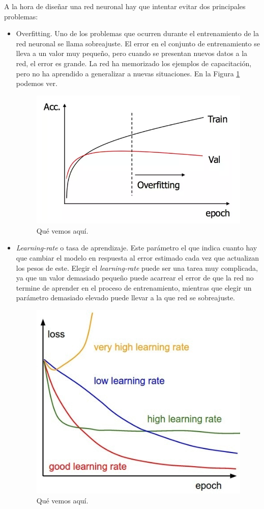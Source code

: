 \documentclass[
  a4paper,
  12pt,
  spanish,
]{scrartcl}
\theoremstyle{teorema-style}
\begin{document}
A la hora de diseñar una red neuronal hay que intentar evitar dos principales problemas:
\begin{itemize}

\item Overfitting. Uno de los problemas que ocurren durante el entrenamiento de la red neuronal se llama sobreajuste. El error en el conjunto de entrenamiento se lleva a un valor muy pequeño, pero cuando se presentan nuevos datos a la red, el error es grande. La red ha memorizado los ejemplos de capacitación, pero no ha aprendido a generalizar a nuevas situaciones. En la Figura \ref{fig:overfitting} podemos ver.

\begin{figure}[h]
  \centering
  \includegraphics[width=.8\textwidth]{img/overfitting}
  \caption{Qué vemos aquí.}
  \label{fig:overfitting}
\end{figure}

\item \textit{Learning-rate} o tasa de aprendizaje. Este parámetro el que indica cuanto hay que cambiar el modelo en respuesta al error estimado cada vez que actualizan los pesos de este. Elegir el \textit{learning-rate} puede ser una tarea muy complicada, ya que un valor demasiado pequeño puede acarrear el error de que la red no termine de aprender en el proceso de entrenamiento, mientras que elegir un parámetro demasiado elevado puede llevar a la que red se sobreajuste.

\begin{figure}[h]
  \centering
  \includegraphics[width=.8\textwidth]{img/learning-rate}
  \caption{Qué vemos aquí.}
  \label{fig:learning-rate}
\end{figure}


\end{itemize}
\end{document}
